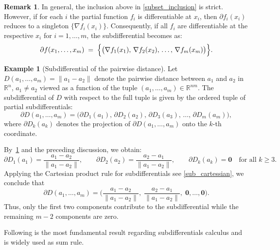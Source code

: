 \documentclass[12pt]{article}
\theoremstyle{plain}
\theoremstyle{definition}
\newtheorem{remark}[theorem]{Remark}
\newtheorem{example}[theorem]{Example}
\begin{document}
\begin{remark}\label{remark:subgradient_equality}
	In general, the inclusion above in \ref{subset_inclusion}  is strict. However, if for each \(i\) the partial function \(f_i\) is differentiable at \(x_i\), then \(\partial f_i(x_i)\) reduces to a singleton \(\{\nabla f_i(x_i)\}\). Consequently, if all \(f_i\) are differentiable at the respective \(x_i\) for \(i = 1, \dots, m\), the subdifferential becomes as:
	\begin{equation}\label{sub_cartessian}
		\partial f(x_1,\dots,x_m)
		\;=\;
		\Bigl\{
		\bigl(\nabla f_1(x_1),\,\nabla f_2(x_2),\,\dots,\,\nabla f_m(x_m)\bigr)
		\Bigr\}.
	\end{equation}
\end{remark}



\begin{example}[Subdifferential of the pairwise distance]
	\label{ex:subdiff_distance}
	Let \( D(a_1, \dots, a_m) = \|a_1 - a_2\| \) denote the pairwise distance between \( a_1 \) and \( a_2 \) in \( \mathbb{R}^n \), $a_1 \ne a_2$ viewed as a function of the tuple \( (a_1, \dots, a_m) \in \mathbb{R}^{nm}\). The subdifferential of \( D \) with respect to the full tuple is given by the ordered tuple of partial subdifferentials:
	\[
	\partial D(a_1, \dots, a_m) = \bigl( \partial D_1(a_1),\, \partial D_2(a_2),\, \partial D_3(a_3),\, \dots,\, \partial D_m(a_m) \bigr),
	\]
	where \( \partial D_k(a_k) \) denotes the projection of \( \partial D(a_1, \dots, a_m) \) onto the \( k \)-th coordinate.
	
	By~\ref{remark:subgradient_equality} and the preceding discussion, we obtain:
	\[
	\partial D_1(a_1) = \frac{a_1 - a_2}{\|a_1 - a_2\|}, \qquad
	\partial D_2(a_2) = \frac{a_2 - a_1}{\|a_1 - a_2\|}, \qquad
	\partial D_k(a_k) = \mathbf{0} \quad \text{for all } k \ge 3.
	\]
	Applying the Cartesian product rule for subdifferentials see \eqref{sub_cartessian}, we conclude that
	\[
	\partial D(a_1, \dots, a_m) =
	\biggl(
	\frac{a_1 - a_2}{\|a_1 - a_2\|},\;
	\frac{a_2 - a_1}{\|a_1 - a_2\|},\;
	\mathbf{0}, \dots, \mathbf{0}
	\biggr).
	\]
	Thus, only the first two components contribute to the subdifferential while the remaining \( m - 2 \) components are zero.
\end{example}

Following is the most fundamental result regarding subdifferentials calculus and is widely used as sum rule.
\end{document}
